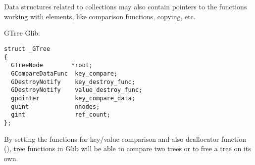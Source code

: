 ﻿\section{}




\subsection{}

{Data structures related to collections may also contain pointers to the functions working with elements,
like comparison functions, copying, etc}.

 \InENRU GTree \InENRU Glib:

\begin{lstlisting}[caption=gtree.c]
struct _GTree
{
  GTreeNode        *root;
  GCompareDataFunc  key_compare;
  GDestroyNotify    key_destroy_func;
  GDestroyNotify    value_destroy_func;
  gpointer          key_compare_data;
  guint             nnodes;
  gint              ref_count;
};
\end{lstlisting}

{By setting the functions for key/value comparison and also deallocator function} (\InENRU {}),
{tree functions in Glib will be able to compare two trees or to free a tree on its own}.

